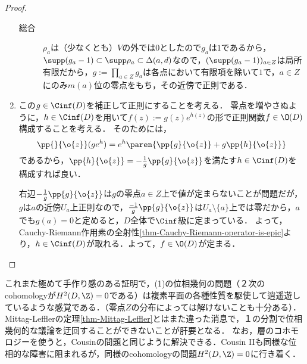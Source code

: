 \documentclass[uplatex, dvipdfmx]{jsreport}
\begin{document}
\begin{proof}
\begin{enumerate}
\begin{description}
        \item[総合] $\rho_a$は（少なくとも）$V$の外では$0$としたので$g_a$は$1$であるから，
        $\supp(g_a-1)\subset\supp\rho_a\subset\Delta(a,d)$なので，$(\supp(g_a-1))_{a\in Z}$は局所有限だから，$g:=\prod_{a\in Z}g_a$は各点において有限項を除いて$1$で，$a\in Z$にのみ$m(a)$位の零点をもち，その近傍で正則である．
    \end{description}
    \item この$g\in\Cinf(D)$を補正して正則にすることを考える．
    零点を増やさぬように，$h\in\Cinf(D)$を用いて$f(z):=g(z)e^{h(z)}$の形で正則関数$f\in\O(D)$構成することを考える．
    そのためには，
    \[\pp{}{\o{z}}(ge^h)=e^h\paren{\pp{g}{\o{z}}+g\pp{h}{\o{z}}}\]
    であるから，$\pp{h}{\o{z}}=-\frac{1}{g}\pp{g}{\o{z}}$を満たす$h\in\Cinf(D)$を構成すれば良い．

    右辺$-\frac{1}{g}\pp{g}{\o{z}}$は$g$の零点$a\in Z$上で値が定まらないことが問題だが，
    $g$は$a$の近傍$U_a$上正則なので，$\frac{-1}{g}\pp{g}{\o{z}}$は$U_a\setminus\{a\}$上では零だから，$a$でも$g(a)=0$と定めると，$D$全体で$\Cinf$級に定まっている．
    よって，Cauchy-Riemann作用素の全射性\ref{thm-Cauchy-Riemann-operator-is-epic}より，$h\in\Cinf(D)$が取れる．よって，$f\in\O(D)$が定まる．
    \end{enumerate}
\end{proof}
\begin{remarks}
    これまた極めて手作り感のある証明で，(1)の位相幾何の問題（２次のcohomologyが$H^2(D,\Z)=0$である）は複素平面の各種性質を駆使して逍遥遊しているような感覚である．（零点$Z$の分布によっては解けないことも十分ある）．
    Mittag-Lefflerの定理\ref{thm-Mittag-Leffler}とはまた違った消息で，１の分割で位相幾何的な議論を迂回することができないことが肝要となる．
    なお，層のコホモロジーを使うと，Cousinの問題と同じように解決できる．Cousin IIも同様な位相的な障害に阻まれるが，同様のcohomologyの問題$H^2(D,\Z)=0$に行き着く．
\end{remarks}
\end{document}
